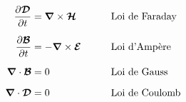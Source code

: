 \documentclass{article}
\begin{document}
  \begin{align}
   \begin{aligned}
    \frac{\partial \bm{\mathcal{D}}}{\partial t} &= \bm{\nabla} \times \bm{\mathcal{H}}
                &\qquad &\text{Loi de Faraday}\\[2\jot]
    \frac{\partial \bm{\mathcal{B}}}{\partial t} &= -\bm{\nabla} \times \bm{\mathcal{E}}
                &\qquad &\text{Loi d'Amp\`{e}re}\\[2\jot]
    \bm{\nabla} \cdot \bm{\mathcal{B}}    &= 0 & \qquad &\text{Loi de Gauss}\\[2\jot]
    \bm{\nabla} \cdot \bm{\mathcal{D}}    &= 0 & \qquad &\text{Loi de Coulomb}
   \end{aligned}
  \end{align}
\end{document}
